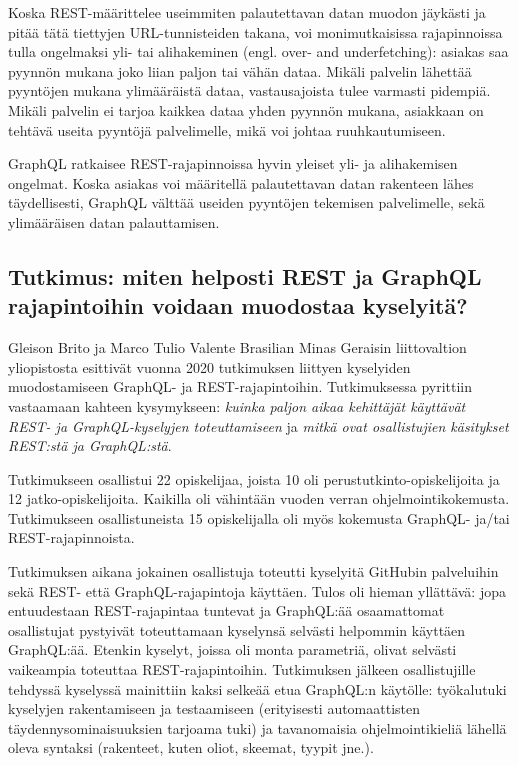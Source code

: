 Koska REST-määrittelee useimmiten palautettavan datan muodon jäykästi ja pitää tätä tiettyjen URL-tunnisteiden takana, voi monimutkaisissa rajapinnoissa tulla ongelmaksi yli- tai alihakeminen (engl. over- and underfetching): asiakas saa pyynnön mukana joko liian paljon tai vähän dataa. Mikäli palvelin lähettää pyyntöjen mukana ylimääräistä dataa, vastausajoista tulee varmasti pidempiä. Mikäli palvelin ei tarjoa kaikkea dataa yhden pyynnön mukana, asiakkaan on tehtävä useita pyyntöjä palvelimelle, mikä voi johtaa ruuhkautumiseen.

GraphQL ratkaisee REST-rajapinnoissa hyvin yleiset yli- ja alihakemisen ongelmat. Koska asiakas voi määritellä palautettavan datan rakenteen lähes täydellisesti, GraphQL välttää useiden pyyntöjen tekemisen palvelimelle, sekä ylimääräisen datan palauttamisen.

\subsection{Tutkimus: miten helposti REST ja GraphQL rajapintoihin voidaan muodostaa kyselyitä?}

Gleison Brito ja Marco Tulio Valente Brasilian Minas Geraisin liittovaltion yliopistosta esittivät vuonna 2020 tutkimuksen liittyen kyselyiden muodostamiseen GraphQL- ja REST-rajapintoihin. Tutkimuksessa pyrittiin vastaamaan kahteen kysymykseen: \textit{kuinka paljon aikaa kehittäjät käyttävät REST- ja GraphQL-kyselyjen toteuttamiseen} ja \textit{mitkä ovat osallistujien käsitykset REST:stä ja GraphQL:stä}. \cite{Brito2020}

Tutkimukseen osallistui 22 opiskelijaa, joista 10 oli perustutkinto-opiskelijoita ja 12 jatko-opiskelijoita. Kaikilla oli vähintään vuoden verran ohjelmointikokemusta. Tutkimukseen osallistuneista 15 opiskelijalla oli myös kokemusta GraphQL- ja/tai REST-rajapinnoista. \cite{Brito2020}

Tutkimuksen aikana jokainen osallistuja toteutti kyselyitä GitHubin palveluihin sekä REST- että GraphQL-rajapintoja käyttäen. Tulos oli hieman yllättävä: jopa entuudestaan REST-rajapintaa tuntevat ja GraphQL:ää osaamattomat osallistujat pystyivät toteuttamaan kyselynsä selvästi helpommin käyttäen GraphQL:ää. Etenkin kyselyt, joissa oli monta parametriä, olivat selvästi vaikeampia toteuttaa REST-rajapintoihin. Tutkimuksen jälkeen osallistujille tehdyssä kyselyssä mainittiin kaksi selkeää etua GraphQL:n käytölle: työkalutuki kyselyjen rakentamiseen ja testaamiseen (erityisesti automaattisten täydennysominaisuuksien tarjoama tuki) ja tavanomaisia ohjelmointikieliä lähellä oleva syntaksi (rakenteet, kuten oliot, skeemat, tyypit jne.). \cite{Brito2020}

